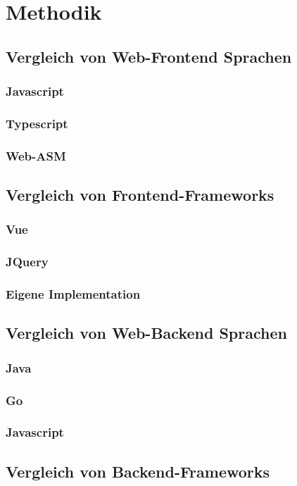 \chapter{Methodik}
\section{Vergleich von Web-Frontend Sprachen}
\subsection{Javascript}
\subsection{Typescript}
\subsection{Web-ASM}
\section{Vergleich von Frontend-Frameworks}
\subsection{Vue}
\subsection{JQuery}
\subsection{Eigene Implementation}
\section{Vergleich von Web-Backend Sprachen}
\subsection{Java}
\subsection{Go}
\subsection{Javascript}
\section{Vergleich von Backend-Frameworks}
